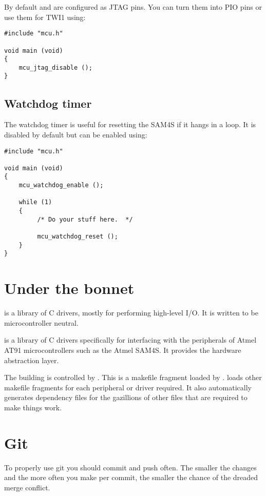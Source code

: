 By default  and  are configured as JTAG pins. You can turn
them into PIO pins or use them for TWI1 using:
%
\begin{verbatim}
#include "mcu.h"

void main (void)
{
    mcu_jtag_disable ();
}
\end{verbatim}

\subsection{Watchdog timer}
\label{watchdog-timer}

The watchdog timer is useful for resetting the SAM4S if it hangs in a
loop.  It is disabled by default but can be enabled using:
%
\begin{verbatim}
#include "mcu.h"

void main (void)
{
    mcu_watchdog_enable ();
   
    while (1)
    {
         /* Do your stuff here.  */

         mcu_watchdog_reset ();
    }
}
\end{verbatim}

\section{Under the bonnet}
\label{under-the-bonnet}

 is a library of C drivers, mostly for performing high-level I/O.
It is written to be microcontroller neutral.

 is a library of C drivers specifically for interfacing
with the peripherals of Atmel AT91 microcontrollers such as the Atmel
SAM4S. It provides the hardware abstraction layer.

The building is controlled by . This is a
makefile fragment loaded by .
 loads other makefile fragments for each
peripheral or driver required. It also automatically generates
dependency files for the gazillions of other files that are required to
make things work.

\section{Git}
\label{git}

To properly use git you should commit and push often. The smaller the
changes and the more often you make per commit, the smaller the chance
of the dreaded merge conflict.

